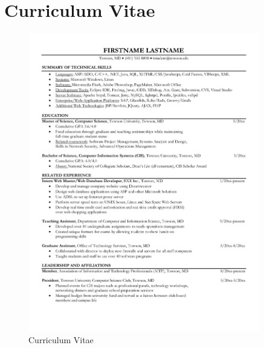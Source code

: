 
\chapter{Curriculum Vitae}\label{sec:curriculum-vitae}

\begin{figure}[H]
    \centering
    \includegraphics[page=1, width=0.9\textwidth]{../application-docs/applicant/curriculum-vitae.pdf}
    \caption{Curriculum Vitae}
    \label{fig:curriculum-vitae}
\end{figure}

\clearpage
